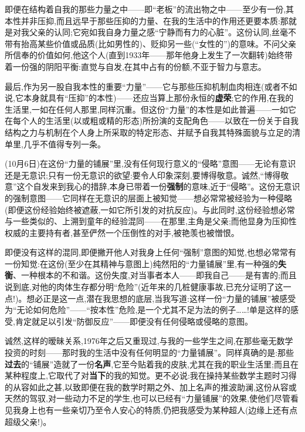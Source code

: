即便在结构着自我的那些力量之中——即“老板”的流出物之中——至少有一份,其本性并非压抑,而且远早于那些压抑的力量、在我的生活中的作用还更要本质:那就是对我父亲的认同;它宛如我自身力量之感“宁静而有力的心脏”。这份认同,丝毫不带有抬高某些价值或品质(比如男性的)、贬抑另一些(“女性的”)的意味。不问父亲所信奉的价值如何,他这个人(直到1933年——那年他身上发生了一次翻转)始终带着一份强的阴阳平衡:直觉与自发,在其中占有的份额,不亚于智力与意志。

最后,作为另一股自我本性的重要“力量”——它与那些压抑机制血肉相连(或者不如说,它本身就具有“压抑”的本性)——还应当算上那份永恒的\textbf{虚荣};它的作用,在我的生活里,一如在任何人那里,同样沉重。但这份“力量”的本性是如此普遍——一如它在每个人的生活里(以或粗或精的形态)所扮演的支配角色——以致在一份关于自我结构之力与机制在个人身上所采取的特定形态、并赋予自我其特殊面貌与立足的清单里,几乎不值得专列一条。

\label{ch18:local:n8}

\dmark{}(10月6日)在这份“力量的铺展”里,没有任何现行意义的“侵略”意图——无论有意识还是无意识;只有一份无意识的欲望:要令人印象深刻,要博得敬意。诚然,“博得敬意”这个自发来到我心的措辞,本身已带着一份\textbf{强制}的意味,近于“侵略”。这份无意识的强制意图——它同样在无意识的层面上被知觉——想必常常被经验为一种侵略(即便这份经验始终被遮蔽,一如它所引发的对抗反应)。与此同时,这份经验想必常与一些类似的、上溯到童年的经验混同——在那里,主角是父亲;而他显身为压抑性权威的主要持有者,甚至俨然一个压倒性的对手,被艳羡也被憎恨。

即便没有这样的混同,即便撇开他人对我身上任何“强制”意图的知觉,也想必常常有一份知觉:在这份(至少在其精神与意图上)纯然阳的“力量铺展”里,有一种强的\textbf{失衡}、一种根本的不和谐。这份失度,对当事者本人——即我自己——是有害的;而且说到底,对他的肉体生存都分明“危险”(近年来的几桩健康事故,已充分证明了这一点!)。想必正是这一点,潜在我思想的底层,当我写道:这样一份“力量的铺展”被感受为“无论如何危险”——“按本性”危险,是一个尤其不足为法的例子……!单是这样的感受,肯定就足以引发“防御反应”——即便没有任何侵略或侵略的意图。

诚然,这样的暧昧关系,1976年之后又重现过,与我的一些学生之间,在那些毫无数学投资的时刻——那时我的生活中没有任何明显的“力量铺展”。同样真确的是:那些\textbf{过去}的“铺展”造就了一份\textbf{名声},它至今贴着我的皮肤,尤其在我的职业生活里;而且在某种程度上,它取代了对\textbf{当下}的我的知觉。更不必说:我在操持某些数学主题时习得的从容如此之甚,以致即便在我的数学时期之外、加上名声的推波助澜,这份从容或天然的驾驭,对一些动力不足的学生,也可以已经有“力量铺展”的效果,使他们尽管看见我身上也有一些亲切乃至令人安心的特质,仍把我感受为某种超人(边缘上还有点超级父亲!)\dmark{}。

